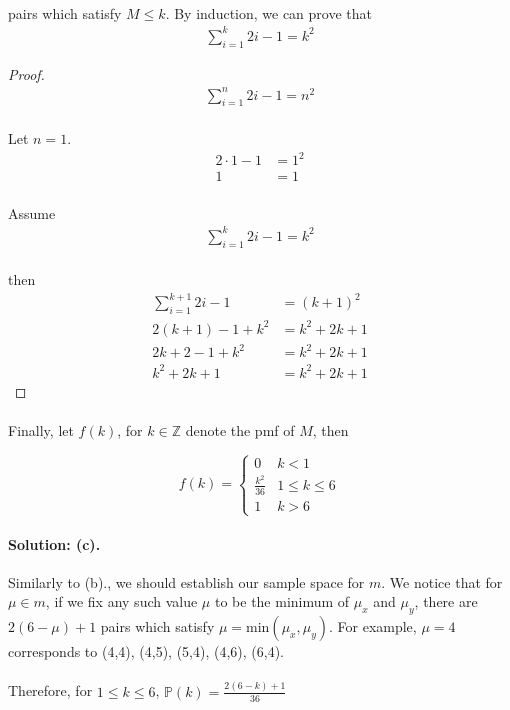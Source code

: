 \documentclass{article}
\begin{document}
\paragraph{}pairs which satisfy $M \le k$. By induction, we can prove that
\begin{align*}
    \sum_{i=1}^{k} 2i - 1 = k^{2}
\end{align*}
\begin{proof}
    \begin{align*}
        \displaystyle\sum_{i=1}^n 2i-1 = n^{2}
    \end{align*}
    \paragraph{}Let $n = 1$. 
    \begin{align*}
        2\cdot1 - 1 &= 1^{2}\\
        1&=1
    \end{align*}
    \paragraph{}Assume 
    \begin{align*}
        \sum_{i=1}^{k} 2i - 1 = k^{2}
    \end{align*}
    \paragraph{}then
     \begin{align*}
         \sum_{i=1}^{k+1} 2i - 1 &= (k+1)^{2}\\
         2(k+1)-1 + k^{2} &= k^2 +2k + 1\\
         2k + 2 - 1 + k^2 &= k^2 + 2k + 1\\
         k^2 + 2k + 1 &= k^2 + 2k + 1
    \end{align*}
\end{proof}
\paragraph{}Finally, let $f(k)$, for $k \in \mathbb{Z}$ denote the pmf of $M$, then

    \[ f(k) = \begin{cases} 
          0 & k < 1 \\
          \frac{k^2}{36} & 1 \le k \le 6\\
          1 & k > 6
       \end{cases}
    \]

\paragraph{Solution: (c).} Similarly to (b)., we should establish our sample space for $m$. We notice
that for $\mu \in m$, if we fix any such value $\mu$ to be the minimum of $\mu_x$ and $\mu_y$, 
there are $2(6-\mu)+1$ pairs which satisfy $\mu = \text{min}(\mu_x, \mu_y)$. For example, $\mu = 4$ corresponds to 
(4,4), (4,5), (5,4), (4,6), (6,4).

\paragraph{}Therefore, for $1 \le k \le 6$, $\mathbb{P}(k) = \frac{2(6-k)+1}{36}$
\end{document}
